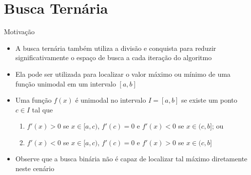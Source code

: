 \section{Busca Ternária}

\begin{frame}[fragile]{Motivação}

    \begin{itemize}
        \item A busca ternária também utiliza a divisão e conquista para reduzir significativamente
            o espaço de busca a cada iteração do algoritmo

        \item Ela pode ser utilizada para localizar o valor máximo ou
            mínimo de uma função unimodal em um intervalo $[a, b]$

        \item Uma função $f(x)$ é unimodal no intervalo $I = [a, b]$ se existe um ponto 
            $c\in I$ tal que
            \begin{enumerate}
                \item $f'(x) > 0$ se $x \in[a, c)$, $f'(c) = 0$ e $f'(x) < 0$ se $x\in (c, b]$; ou
                \item $f'(x) < 0$ se $x \in[a, c)$, $f'(c) = 0$ e $f'(x) > 0$ se $x\in (c, b]$
            \end{enumerate}

        \item Observe que a busca binária não é capaz de localizar tal máximo diretamente
            neste cenário
    \end{itemize}

\end{frame}



